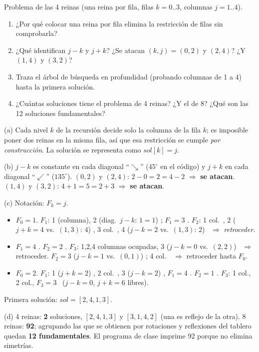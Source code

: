 \begin{prob}
Problema de las 4 reinas (una reina por fila, filas $k=0..3$, columnas $j=1..4$).
\begin{enumerate}[label=(\alph*)]
\item ¿Por qué colocar una reina por fila elimina la restricción de filas sin comprobarla?
\item ¿Qué identifican $j-k$ y $j+k$? ¿Se atacan $(k,j)=(0,2)$ y $(2,4)$? ¿Y $(1,4)$ y $(3,2)$?
\item Traza el árbol de búsqueda en profundidad (probando columnas de 1 a 4) hasta la primera solución.
\item ¿Cuántas soluciones tiene el problema de 4 reinas? ¿Y el de 8? ¿Qué son las 12 soluciones fundamentales?
\end{enumerate}
\end{prob}
\begin{sol}
(a) Cada nivel $k$ de la recursión decide solo la columna de la fila $k$; es imposible poner dos reinas en la misma fila, así que esa restricción se cumple \emph{por construcción}. La solución se representa como $\mathit{sol}[k]=j$.

(b) $j-k$ es constante en cada diagonal ``$\searrow$'' ($45^\circ$ en el código) y $j+k$ en cada diagonal ``$\swarrow$'' ($135^\circ$). $(0,2)$ y $(2,4)$: $2-0=2=4-2$ $\Rightarrow$ \textbf{se atacan}. $(1,4)$ y $(3,2)$: $4+1=5=2+3$ $\Rightarrow$ \textbf{se atacan}.

(c) Notación: $F_k=j$.
\begin{itemize}
\item $F_0=1$. $F_1$: 1 (columna), 2 (diag.\ $j-k$: $1=1$) \texttimes; $F_1=3$ \checkmark. $F_2$: 1 col.\ \texttimes, 2 ($j+k=4$ vs.\ $(1,3)$: $4$) \texttimes, 3 col.\ \texttimes, 4 ($j-k=2$ vs.\ $(1,3)$: $2$) \texttimes\ $\Rightarrow$ \emph{retroceder}.
\item $F_1=4$ \checkmark. $F_2=2$ \checkmark. $F_3$: 1,2,4 columnas ocupadas, 3 ($j-k=0$ vs.\ $(2,2)$) \texttimes\ $\Rightarrow$ retroceder. $F_2=3$ ($j-k=1$ vs.\ $(0,1)$) \texttimes; 4 col.\ \texttimes\ $\Rightarrow$ retroceder hasta $F_0$.
\item $F_0=2$. $F_1$: 1 ($j+k=2$) \texttimes, 2 col.\ \texttimes, 3 ($j-k=2$) \texttimes, $F_1=4$ \checkmark. $F_2=1$ \checkmark. $F_3$: 1 col., 2 col., $F_3=3$ \checkmark\ ($j-k=0$, $j+k=6$ libres).
\end{itemize}
Primera solución: $\mathit{sol}=[2,4,1,3]$.

(d) 4 reinas: \textbf{2} soluciones, $[2,4,1,3]$ y $[3,1,4,2]$ (una es reflejo de la otra). 8 reinas: \textbf{92}; agrupando las que se obtienen por rotaciones y reflexiones del tablero quedan \textbf{12 fundamentales}. El programa de clase imprime 92 porque no elimina simetrías.
\end{sol}

